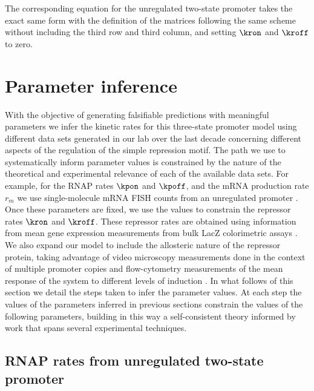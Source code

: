 The corresponding equation for the unregulated two-state promoter takes the
exact same form with the definition of the matrices following the same scheme
without including the third row and third column, and setting $\kron$ and
$\kroff$ to zero.

\section{Parameter inference}

With the objective of generating falsifiable predictions with meaningful
parameters we infer the kinetic rates for this three-state promoter model using
different data sets generated in our lab over the last decade concerning
different aspects of the regulation of the simple repression motif. The path
we use to systematically inform parameter values is constrained by the nature
of the theoretical and experimental relevance of each of the available data
sets. For example, for the RNAP rates $\kpon$ and $\kpoff$, and the mRNA
production rate $r_m$ we use single-molecule mRNA FISH counts from an
unregulated promoter \cite{Jones2014a}. Once these parameters are fixed, we use
the values to constrain the repressor rates $\kron$ and $\kroff$. These
repressor rates are obtained using information from mean gene expression
measurements from bulk LacZ colorimetric assays \cite{Garcia2011c}. We also
expand our model to include the allosteric nature of the repressor protein,
taking advantage of video microscopy measurements done in the context of
multiple promoter copies \cite{Brewster2014} and flow-cytometry measurements of
the mean response of the system to different levels of induction
\cite{Razo-Mejia2018}. In what follows of this section we detail the steps
taken to infer the parameter values. At each step the values of the parameters
inferred in previous sections constrain the values of the following parameters,
building in this way a self-consistent theory informed by work that spans
several experimental techniques.

\subsection{RNAP rates from unregulated two-state promoter}

